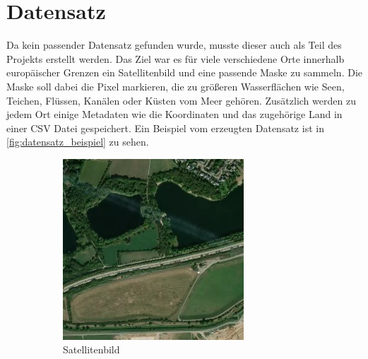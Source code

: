 \section{Datensatz}
\label{sec:Datensatz}

Da kein passender Datensatz gefunden wurde, musste dieser auch als Teil des Projekts erstellt werden.
Das Ziel war es für viele verschiedene Orte innerhalb europäischer Grenzen ein Satellitenbild und eine passende Maske zu sammeln.
Die Maske soll dabei die Pixel markieren, die zu größeren Wasserflächen wie Seen, Teichen, Flüssen, Kanälen oder Küsten vom Meer gehören.
Zusätzlich werden zu jedem Ort einige Metadaten wie die Koordinaten und das zugehörige Land in einer CSV Datei gespeichert.
Ein Beispiel vom erzeugten Datensatz ist in \autoref{fig:datensatz_beispiel} zu sehen.

\begin{figure}
    \centering
    \begin{subfigure}{0.3\textwidth}
        \centering
        \includegraphics[width=\textwidth]{images/datensatz_beispiel_satellit.jpg}
        \caption{Satellitenbild}
        \label{fig:datensatz_beispiel_satellit}
    \end{subfigure}
    \begin{subfigure}{0.3\textwidth}
        \centering

\end{subfigure}
\end{figure}
